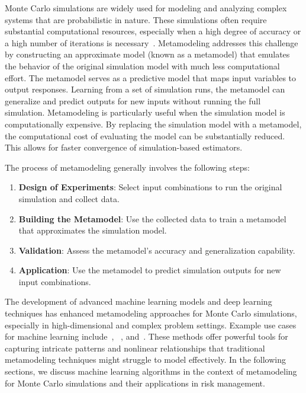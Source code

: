 Monte Carlo simulations are widely used for modeling and analyzing complex systems that are probabilistic in nature. 
These simulations often require substantial computational resources, especially when a high degree of accuracy or a high number of iterations is necessary~\citep{glasserman2004monte}. 
Metamodeling addresses this challenge by constructing an approximate model (known as a metamodel) that emulates the behavior of the original simulation model with much less computational effort.
The metamodel serves as a predictive model that maps input variables to output responses. 
Learning from a set of simulation runs, the metamodel can generalize and predict outputs for new inputs without running the full simulation.
Metamodeling is particularly useful when the simulation model is computationally expensive. 
By replacing the simulation model with a metamodel, the computational cost of evaluating the model can be substantially reduced. 
This allows for faster convergence of simulation-based estimators.

The process of metamodeling generally involves the following steps:

\begin{enumerate} 
    \item \textbf{Design of Experiments}: Select input combinations to run the original simulation and collect data. 
    \item \textbf{Building the Metamodel}: Use the collected data to train a metamodel that approximates the simulation model. 
    \item \textbf{Validation}: Assess the metamodel's accuracy and generalization capability.
    \item \textbf{Application}: Use the metamodel to predict simulation outputs for new input combinations.
\end{enumerate}

The development of advanced machine learning models and deep learning techniques has enhanced metamodeling approaches for Monte Carlo simulations, especially in high-dimensional and complex problem settings.
Example use cases for machine learning include~\cite{jin2020deep}, ~\cite{tang2020deep}, and~\cite{rosen2012metamodeling}.
These methods offer powerful tools for capturing intricate patterns and nonlinear relationships that traditional metamodeling techniques might struggle to model effectively.
In the following sections, we discuss machine learning algorithms in the context of metamodeling for Monte Carlo simulations and their applications in risk management.

